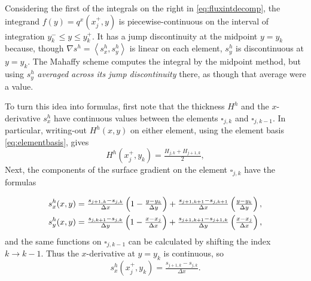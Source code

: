 \documentclass[11pt]{amsart}
\newcommand{\grad}{\nabla}
\newcommand{\ip}[2]{\ensuremath{\left<#1,#2\right>}}
\begin{document}
Considering the first of the integrals on the right in \eqref{eq:fluxintdecomp}, the integrand $f(y) = q^x(x_j^+,y)$ is piecewise-continuous on the interval of integration $y_k^- \le y \le y_k^+$.  It has a jump discontinuity at the midpoint $y=y_k$ because, though $\grad s^h = \ip{s^h_x}{s^h_y}$ is linear on each element, $s^h_y$ is discontinuous at $y=y_k$.  The Mahaffy scheme computes the integral by the midpoint method, but using $s^h_y$ \emph{averaged across its jump discontinuity} there, as though that average were a value.

To turn this idea into formulas, first note that the thickness $H^h$ and the $x$-derivative $s^h_x$ have continuous values between the elements $\square_{j,k}$ and $\square_{j,k-1}$.  In particular, writing-out $H^h(x,y)$ on either element, using the element basis \eqref{eq:elementbasis}, gives
\begin{equation}
H^h(x_j^+,y_k) = \tfrac{H_{j,k}+H_{j+1,k}}{2}, \label{eq:femHstag}
\end{equation}
Next, the components of the surface gradient on the element $\square_{j,k}$ have the formulas
	\begin{comment}
	COMMENT OUT: here is the surface elevation on $\square_{j,k}$
	\begin{align*}
	s^h(x,y) &= s_{j,k} \left(1-\tfrac{x-x_j}{\Delta x}\right) \left(1-\tfrac{y-y_k}{\Delta y}\right)
	    + s_{j+1,k} \left(\tfrac{x-x_j}{\Delta x}\right) \left(1-\tfrac{y-y_k}{\Delta y}\right) \\
	         &\qquad + s_{j,k+1} \left(1-\tfrac{x-x_j}{\Delta x}\right) \left(\tfrac{y-y_k}{\Delta y}\right)
	    + s_{j+1,k+1} \left(\tfrac{x-x_j}{\Delta x}\right) \left(\tfrac{y-y_k}{\Delta y}\right)
	\end{align*}
	\end{comment}
\begin{align}
s^h_x(x,y) &= \tfrac{s_{j+1,k}-s_{j,k}}{\Delta x} \left(1-\tfrac{y-y_k}{\Delta y}\right) + \tfrac{s_{j+1,k+1}-s_{j,k+1}}{\Delta x} \left(\tfrac{y-y_k}{\Delta y}\right), \label{eq:grads} \\
s^h_y(x,y) &= \tfrac{s_{j,k+1}-s_{j,k}}{\Delta y} \left(1-\tfrac{x-x_j}{\Delta x}\right) + \tfrac{s_{j+1,k+1}-s_{j+1,k}}{\Delta y} \left(\tfrac{x-x_j}{\Delta x}\right), \notag
\end{align}
and the same functions on $\square_{j,k-1}$ can be calculated by shifting the index $k\to k-1$.  Thus the $x$-derivative at $y=y_k$ is continuous, so
\begin{equation}
s^h_x(x_j^+,y_k) = \tfrac{s_{j+1,k}-s_{j,k}}{\Delta x}. \label{eq:femsxstag}
\end{equation}
\end{document}

